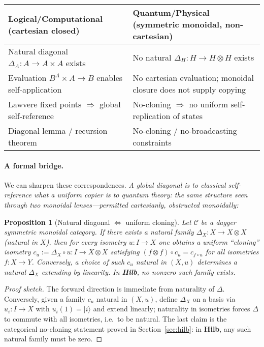 \documentclass[11pt]{article}
\theoremstyle{upright}
\newtheorem{proposition}{Proposition}
\begin{document}
\begin{tabular}{p{} p{}}
\toprule
\textbf{Logical/Computational (cartesian closed)} & \textbf{Quantum/Physical (symmetric monoidal, non-cartesian)}\\
\midrule
Natural diagonal $\Delta_A : A \to A\times A$ exists & No natural $\Delta_H : H \to H\otimes H$ exists \\
Evaluation $B^A \times A \to B$ enables self-application & No cartesian evaluation; monoidal closure does not supply copying \\
Lawvere fixed points $\Rightarrow$ global self-reference & No-cloning $\Rightarrow$ no uniform self-replication of states \\
Diagonal lemma / recursion theorem & No-cloning / no-broadcasting constraints \\
\bottomrule
\end{tabular}


\paragraph{A formal bridge.}
We can sharpen these correspondences. \emph{A global diagonal is to classical self-reference what a uniform copier is to quantum theory: the same structure seen through two monoidal lenses—permitted cartesianly, obstructed monoidally:}

\begin{proposition}[Natural diagonal $\Leftrightarrow$ uniform cloning]
\label{prop:natural-diagonal}
Let $\mathcal{C}$ be a dagger symmetric monoidal category. If there exists a natural family $\Delta_X : X \to X\otimes X$ (natural in $X$), then for every isometry $u:I\to X$ one obtains a uniform ``cloning'' isometry $c_u := \Delta_X \circ u : I \to X\otimes X$ satisfying $(f\otimes f)\circ c_u = c_{f\circ u}$ for all isometries $f:X\to Y$. Conversely, a choice of such $c_u$ natural in $(X,u)$ determines a natural $\Delta_X$ extending by linearity. In \textbf{Hilb}, no nonzero such family exists.
\end{proposition}

\begin{proof}[Proof sketch]
The forward direction is immediate from naturality of $\Delta$. Conversely, given a family $c_u$ natural in $(X,u)$, define $\Delta_X$ on a basis via $u_i:I\to X$ with $u_i(1)=|i\rangle$ and extend linearly; naturality in isometries forces $\Delta$ to commute with all isometries, i.e.\ to be natural. The last claim is the categorical no-cloning statement proved in Section~\ref{sec:hilb}: in \textbf{Hilb}, any such natural family must be zero.
\end{proof}
\end{document}
